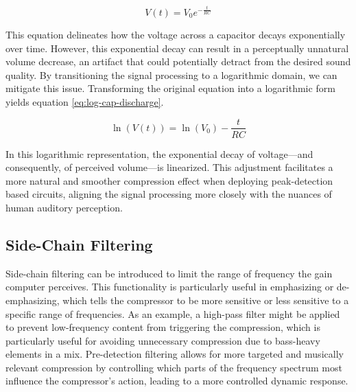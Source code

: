 \documentclass[10pt]{article}
\begin{document}
\begin{multicols*}{2}
                    \begin{equation}\label{eq:lin-cap-discharge}
                        V(t) = V_0 e^{-\frac{t}{RC}}
                    \end{equation}    
                
                \noindent This equation delineates how the voltage across a capacitor decays exponentially over time. However, this exponential decay can result in a perceptually unnatural volume decrease, an artifact that could potentially detract from the desired sound quality. By transitioning the signal processing to a logarithmic domain, we can mitigate this issue. Transforming the original equation into a logarithmic form yields equation \ref{eq:log-cap-discharge}.
                
                    \begin{equation}\label{eq:log-cap-discharge}
                        \ln(V(t)) = \ln(V_0) - \frac{t}{RC}
                    \end{equation}
                
                \noindent In this logarithmic representation, the exponential decay of voltage—and consequently, of perceived volume—is linearized. This adjustment facilitates a more natural and smoother compression effect when deploying peak-detection based circuits, aligning the signal processing more closely with the nuances of human auditory perception. 
                
            \subsection{Side-Chain Filtering}
                Side-chain filtering can be introduced to limit the range of frequency the gain computer perceives. This functionality is particularly useful in emphasizing or de-emphasizing, which tells the compressor to be more sensitive or less sensitive to a specific range of frequencies. As an example, a high-pass filter might be applied to prevent low-frequency content from triggering the compression, which is particularly useful for avoiding unnecessary compression due to bass-heavy elements in a mix. Pre-detection filtering allows for more targeted and musically relevant compression by controlling which parts of the frequency spectrum most influence the compressor's action, leading to a more controlled dynamic response.\cite{side-chain-filtering}
                

\end{multicols*}
\end{document}
